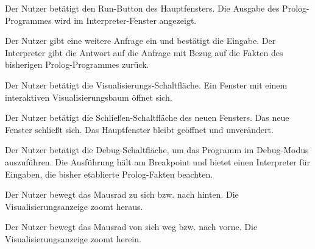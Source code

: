 \documentclass[parskip=full,11pt,twoside]{scrartcl}
\begin{document}

{Der Nutzer betätigt den Run-Button des Hauptfensters.}
{Die Ausgabe des Prolog-Programmes wird im Interpreter-Fenster angezeigt.}

{Der Nutzer gibt eine weitere Anfrage ein und bestätigt die Eingabe.}
{Der Interpreter gibt die Antwort auf die Anfrage mit Bezug auf die Fakten des bisherigen Prolog-Programmes zurück.}



{Der Nutzer betätigt die Visualisierungs-Schaltfläche.}
{Ein Fenster mit einem interaktiven Visualisierungsbaum öffnet sich.}

{Der Nutzer betätigt die Schließen-Schaltfläche des neuen Fensters.}
{Das neue Fenster schließt sich. Das Hauptfenster bleibt geöffnet und unverändert.}




{Der Nutzer betätigt die Debug-Schaltfläche, um das Programm im Debug-Modus auszuführen.}
{Die Ausführung hält am Breakpoint und bietet einen Interpreter für Eingaben, die bisher etablierte Prolog-Fakten beachten.}



{Der Nutzer bewegt das Mausrad zu sich bzw. nach hinten.}
{Die Visualisierungsanzeige zoomt heraus.}

{Der Nutzer bewegt das Mausrad von sich weg bzw. nach vorne.}
{Die Visualisierungsanzeige zoomt herein.}
\end{document}
